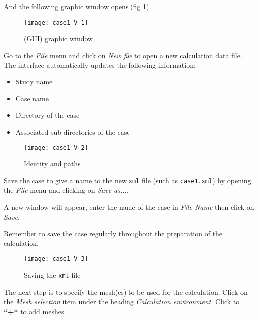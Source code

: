 And the following graphic window opens (fig \ref{fig1_e1}).


\begin{figure}[ht]
\begin{center}
\texttt{[image: case1\_V-1]}
\caption{\CS (GUI) graphic window}
\label{fig1_e1}
\end{center}
\end{figure}


\clearpage
Go to the {\itshape File} menu and click on {\itshape New file} to open a new
calculation data file. The interface automatically updates the following information:
\begin{itemize}
        \item Study name
        \item Case name
        \item Directory of the case
        \item Associated sub-directories of the case
\end{itemize}

\begin{figure}[ht]
\begin{center}
\texttt{[image: case1\_V-2]}
\caption{Identity and paths}
\label{fig2_e1}
\end{center}
\end{figure}


\clearpage
Save the case to give a name to the new \texttt{xml} file (such as \texttt{case1.xml})
by opening the {\itshape File} menu and clicking on {\itshape Save as...}.

A new window will appear, enter the name of the case in {\itshape File Name} then click on
{\itshape Save}.

Remember to save the case regularly throughout the preparation of the calculation.

\begin{figure}[ht]
\begin{center}
\texttt{[image: case1\_V-3]}
\caption{Saving the \texttt{xml} file}
\label{fig4_e1}
\end{center}
\end{figure}


\clearpage
The next step is to specify the mesh(es) to be used for the calculation.
Click on the {\itshape Mesh selection} item under the heading {\itshape Calculation environment}.
Click to {\bf ``+``} to add meshes.

